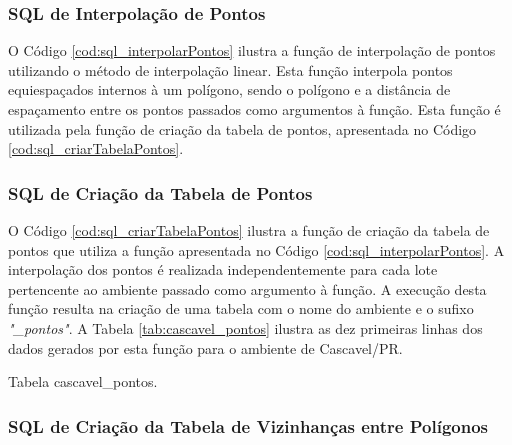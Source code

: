 

\subsubsection{SQL de Interpolação de Pontos}

O Código \ref{cod:sql_interpolarPontos} ilustra a função de interpolação de pontos utilizando o método de interpolação linear. Esta função interpola pontos equiespaçados internos à um polígono, sendo o polígono e a distância de espaçamento entre os pontos passados como argumentos à função. Esta função é utilizada pela função de criação da tabela de pontos, apresentada no Código \ref{cod:sql_criarTabelaPontos}. 



\subsubsection{SQL de Criação da Tabela de Pontos}

O Código \ref{cod:sql_criarTabelaPontos} ilustra a função de criação da tabela de pontos que utiliza a função apresentada no Código \ref{cod:sql_interpolarPontos}. A interpolação dos pontos é realizada independentemente para cada lote pertencente ao ambiente passado como argumento à função. A execução desta função resulta na criação de uma tabela com o nome do ambiente e o sufixo \textit{"\_pontos"}. A Tabela \ref{tab:cascavel_pontos} ilustra as dez primeiras linhas dos dados gerados por esta função para o ambiente de Cascavel/PR.



\begin{table}[H]
\centering
{}
\caption{Tabela cascavel\_pontos.}
\label{tab:cascavel_pontos}
\end{table}

\subsubsection{SQL de Criação da Tabela de Vizinhanças entre Polígonos}

